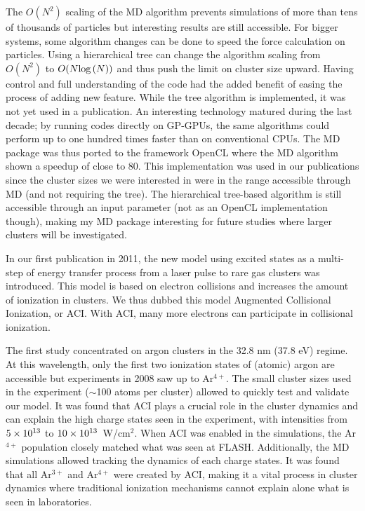 The $O(N^2)$ scaling of the MD algorithm prevents simulations of more than tens
of thousands of particles but interesting results are still accessible.
For bigger systems, some algorithm changes can be done to speed the force
calculation on particles. Using a hierarchical tree can change the algorithm
scaling from $O(N^2)$ to $O(N \textrm{log}\left( N \right))$ and thus push the limit on
cluster size upward. Having control and full understanding of the code had
the added benefit of easing the process of adding new feature. While the tree
algorithm is implemented, it was not yet used in a publication. An interesting
technology matured during the last decade; by running codes directly on GP-GPUs,
the same algorithms could perform up to one hundred times faster than on
conventional CPUs. The MD package was thus ported to the framework OpenCL where
the MD algorithm shown a speedup of close to 80. This implementation was used
in our publications since the cluster sizes we were interested in were
in the range accessible through MD (and not requiring the tree). The
hierarchical tree-based algorithm is still accessible through an input parameter
(not as an OpenCL implementation though), making my MD package interesting for
future studies where larger clusters will be investigated.

In our first publication in 2011, the new model using excited states as a
multi-step of energy transfer process from a laser pulse to rare gas clusters
was introduced. This model is based on electron collisions and increases the
amount of ionization in clusters. We thus dubbed this model Augmented
Collisional Ionization, or ACI. With ACI, many more electrons can participate in
collisional ionization.

The first study concentrated on argon clusters in the 32.8 nm (37.8 eV) regime.
At this wavelength, only the first two ionization states of (atomic) argon are
accessible but experiments in 2008 saw up to Ar$^{4+}$. The small cluster sizes
used in the experiment ($\sim$100 atoms per cluster) allowed to quickly test and
validate our model. It was found that ACI plays a crucial role in the cluster
dynamics and can explain the high charge states seen in the experiment, with
intensities from $\ten{5}{13}$ to $\ten{10}{13}$~W/cm$^{2}$. When ACI was
enabled in the simulations, the Ar$^{4+}$ population closely matched what was
seen at FLASH. Additionally, the MD simulations allowed tracking the dynamics
of each charge states. It was found that all Ar$^{3+}$ and Ar$^{4+}$ were
created by ACI, making it a vital process in cluster dynamics where traditional
ionization mechanisms cannot explain alone what is seen in laboratories.

